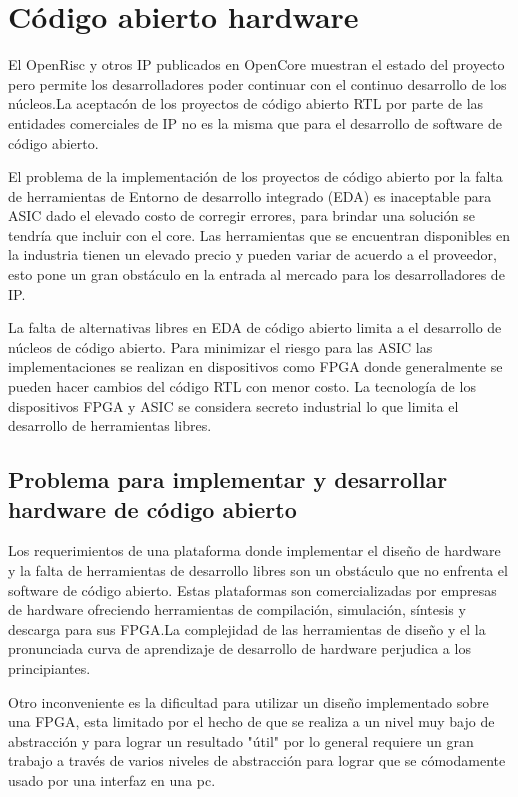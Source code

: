 \section {Código abierto hardware}

El OpenRisc y otros IP  publicados en OpenCore muestran el estado del proyecto pero permite los desarrolladores poder continuar con el continuo desarrollo de los núcleos.La aceptacón de los proyectos de código abierto RTL por parte de las entidades comerciales de IP no es la misma que para el desarrollo de software de código abierto.

El problema de la implementación de los proyectos de código abierto por la falta de herramientas de Entorno de desarrollo integrado (EDA)  es inaceptable para ASIC dado el elevado costo de corregir errores, para brindar una solución se tendría que incluir con el core. Las herramientas  que se encuentran disponibles en la industria tienen un elevado precio y pueden variar de acuerdo a el proveedor, esto pone un gran obstáculo en la entrada al mercado para los desarrolladores de IP.

La falta de alternativas libres en EDA de código abierto limita a el desarrollo de núcleos de código abierto. Para minimizar el riesgo para las ASIC las implementaciones se realizan en dispositivos como FPGA donde generalmente se pueden hacer cambios del código RTL con menor costo. La tecnología de los dispositivos FPGA y ASIC se considera secreto industrial
lo que limita el desarrollo de herramientas libres.
	\subsection{Problema para implementar y desarrollar hardware de código abierto }

Los requerimientos de una plataforma donde implementar el diseño de hardware y la falta de herramientas de desarrollo libres son un obstáculo que no enfrenta el software de código abierto. Estas plataformas son comercializadas por empresas de hardware ofreciendo herramientas de  compilación, simulación, síntesis y descarga para sus FPGA.La complejidad de las herramientas de diseño y el la pronunciada curva de aprendizaje de desarrollo de hardware perjudica a los principiantes. 

Otro inconveniente es la dificultad para utilizar un diseño implementado sobre una FPGA, esta limitado por el hecho de que se realiza a un nivel muy bajo de abstracción y para lograr un resultado "útil" por lo general requiere un gran trabajo a través de varios niveles de abstracción para lograr que se cómodamente usado por una interfaz en una pc.

